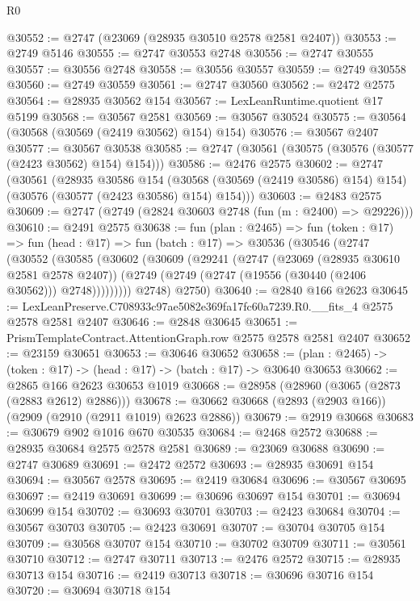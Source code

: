 \begin{lexlean}{R0}
\begin{coremodule}
@30552 := @2747 (@23069 (@28935 @30510 @2578 @2581 @2407))
@30553 := @2749 @5146
@30555 := @2747 @30553 @2748
@30556 := @2747 @30555
@30557 := @30556 @2748
@30558 := @30556 @30557
@30559 := @2749 @30558
@30560 := @2749 @30559
@30561 := @2747 @30560
@30562 := @2472 @2575
@30564 := @28935 @30562 @154
@30567 := LexLeanRuntime.quotient @17 @5199
@30568 := @30567 @2581
@30569 := @30567 @30524
@30575 := @30564 (@30568 (@30569 (@2419 @30562) @154) @154)
@30576 := @30567 @2407
@30577 := @30567 @30538
@30585 := @2747 (@30561 (@30575 (@30576 (@30577 (@2423 @30562) @154) @154)))
@30586 := @2476 @2575
@30602 := @2747
    (@30561
      (@28935
        @30586
        @154
        (@30568 (@30569 (@2419 @30586) @154) @154)
        (@30576 (@30577 (@2423 @30586) @154) @154)))
@30603 := @2483 @2575
@30609 := @2747 (@2749 (@2824 @30603 @2748 (fun (m : @2400) => @29226)))
@30610 := @2491 @2575
@30638 := fun (plan : @2465) =>
  fun (token : @17) =>
  fun (head : @17) =>
  fun (batch : @17) =>
  @30536
    (@30546
      (@2747
        (@30552
          (@30585
            (@30602
              (@30609
                (@29241
                  (@2747
                    (@23069 (@28935 @30610 @2581 @2578 @2407))
                    (@2749 (@2749 (@2747 (@19556 (@30440 (@2406 @30562))) @2748)))))))))
        @2748)
      @2750)
@30640 := @2840 @166 @2623
@30645 := LexLeanPreserve.C708933c97ae5082e369fa17fc60a7239.R0.__fits_4 @2575 @2578 @2581 @2407
@30646 := @2848 @30645
@30651 := PrismTemplateContract.AttentionGraph.row @2575 @2578 @2581 @2407
@30652 := @23159 @30651
@30653 := @30646 @30652
@30658 := (plan : @2465) -> (token : @17) -> (head : @17) -> (batch : @17) -> @30640 @30653
@30662 := @2865 @166 @2623 @30653 @1019
@30668 := @28958 (@28960 (@3065 (@2873 (@2883 @2612) @2886)))
@30678 := @30662 @30668 (@2893 (@2903 @166)) (@2909 (@2910 (@2911 @1019) @2623 @2886))
@30679 := @2919 @30668
@30683 := @30679 @902 @1016 @670 @30535
@30684 := @2468 @2572
@30688 := @28935 @30684 @2575 @2578 @2581
@30689 := @23069 @30688
@30690 := @2747 @30689
@30691 := @2472 @2572
@30693 := @28935 @30691 @154
@30694 := @30567 @2578
@30695 := @2419 @30684
@30696 := @30567 @30695
@30697 := @2419 @30691
@30699 := @30696 @30697 @154
@30701 := @30694 @30699 @154
@30702 := @30693 @30701
@30703 := @2423 @30684
@30704 := @30567 @30703
@30705 := @2423 @30691
@30707 := @30704 @30705 @154
@30709 := @30568 @30707 @154
@30710 := @30702 @30709
@30711 := @30561 @30710
@30712 := @2747 @30711
@30713 := @2476 @2572
@30715 := @28935 @30713 @154
@30716 := @2419 @30713
@30718 := @30696 @30716 @154
@30720 := @30694 @30718 @154

\end{coremodule}
\end{lexlean}
